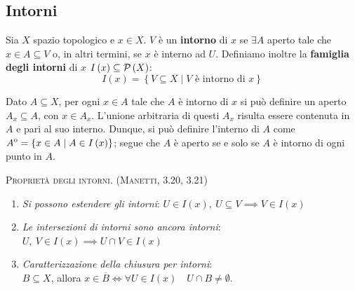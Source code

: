 \subsection{Intorni}
\begin{define}
	Sia $X$ spazio topologico e $x\in X$. $V$ è un \textbf{intorno} di $x$ se $\exists A$ aperto tale che $x\in A\subseteq V$ o, in altri termini, se $x$ è interno ad $U$.
	Definiamo inoltre la \textbf{famiglia degli intorni} di $x$ $I\left(x\right)\subseteq\mathcal{P}\left(X\right)$:
	\begin{equation}
		I\left(x\right)=\left\{V\subseteq X\mid V\text{ è intorno di }x \right\}
	\end{equation}
\end{define}
\begin{observe}
	Dato $A\subseteq X$, per ogni $x\in A$ tale che $A$ è intorno di $x$ si può definire un aperto $A_x\subseteq A$, con $x\in A_x$. L'unione arbitraria di questi $A_x$ risulta essere contenuta in $A$ e pari al suo interno. Dunque, si può definire l'interno di $A$ come ${\kern0ptA}^{\mathrm{o}}=\left\{x\in A\mid A\in I\left(x\right)\right\}$; segue che $A$ è aperto se e solo se $A$ è intorno di ogni punto in $A$.
\end{observe}
\begin{lemming}\textsc{Proprietà degli intorni. (Manetti, 3.20, 3.21)}
	\begin{enumerate}
		\item \textit{Si possono estendere gli intorni}: $U\in I\left(x\right),\ U\subseteq V\implies V\in I\left(x\right)$
		\item \textit{Le intersezioni di intorni sono ancora intorni}: $U,\ V\in I\left(x\right)\implies U\cap V\in I\left(x\right)$
		\item \textit{Caratterizzazione della chiusura per intorni}:\\$B\subseteq X$, allora $x\in\overline{B}\iff\forall U\in I\left(x\right)\quad U\cap B\neq \emptyset$.
	\end{enumerate}
\end{lemming}

